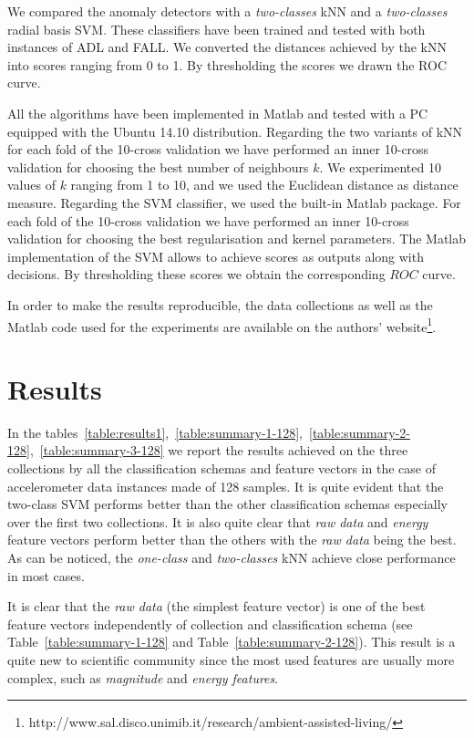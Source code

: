 \documentclass[twocolumn]{svjour3}          \smartqed  \usepackage[draft]{hyperref}
\begin{document}
We compared the anomaly detectors with a \emph{two-classes} kNN and a \emph{two-classes} radial basis SVM. These classifiers have been trained and tested with both instances of ADL and FALL. We converted the distances achieved by the kNN into scores ranging from 0 to 1. By thresholding the scores we drawn the ROC curve.

All the algorithms have been implemented in Matlab and tested with a PC equipped with the Ubuntu 14.10 distribution. Regarding the two variants of kNN for each fold of the 10-cross validation we have performed an inner 10-cross validation for choosing the best number of neighbours $k$. We  experimented 10 values of $k$ ranging from 1 to 10, and we used the Euclidean distance as distance measure. Regarding the SVM classifier, we used the built-in Matlab package. For each fold of the 10-cross validation we have performed an inner 10-cross validation for choosing the best regularisation and kernel parameters. The Matlab implementation of the SVM allows to achieve scores as outputs along with decisions. By thresholding these scores we obtain the corresponding  $ROC$ curve.

In order to make the results reproducible,  the data collections as well as the Matlab code used for the experiments are available on the authors' website\footnote{http://www.sal.disco.unimib.it/research/ambient-assisted-living/}.

\section{Results} \label{sec:results}
In the tables~\ref{table:results1},~\ref{table:summary-1-128},~\ref{table:summary-2-128},~\ref{table:summary-3-128} we report the results achieved on the three collections by all the classification schemas and feature vectors in the case of accelerometer data instances made of 128 samples. It is quite evident that the two-class SVM performs better than the other classification schemas especially over the first two collections. It is also quite clear that \emph{raw data} and \emph{energy} feature vectors perform better than the others with the  \emph{raw data} being the best. As can be noticed, the \emph{one-class} and \emph{two-classes} kNN achieve close performance in most cases. 

It is clear that the \emph{raw data} (the simplest feature vector) is one of the best feature vectors independently of collection and classification schema (see Table~\ref{table:summary-1-128} and Table~\ref{table:summary-2-128}). This result is a quite new to scientific community since the most used features are usually more complex, such as \emph{magnitude} and \emph{energy features}.
\end{document}
